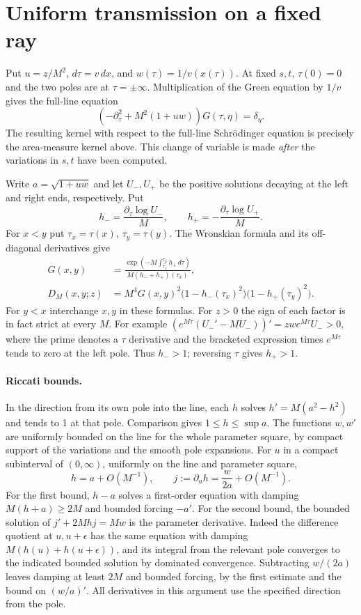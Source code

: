 \documentclass[11pt,letterpaper]{article}
\begin{document}
\section{Uniform transmission on a fixed ray}

Put \(u=z/M^2\), \(d\tau=v\,dx\), and \(w(\tau)=1/v(x(\tau))\).
At fixed \(s,t\), \(\tau(0)=0\) and the two poles are at
\(\tau=\pm\infty\). Multiplication of the Green equation by \(1/v\)
gives the full-line equation
\[
  (-\partial_\tau^2+M^2(1+uw))G(\tau,\eta)=\delta_\eta .
\]
The resulting kernel with respect to the full-line Schrödinger equation
is precisely the area-measure kernel above. This change of variable is
made \emph{after} the variations in \(s,t\) have been computed.

Write \(a=\sqrt{1+uw}\) and let \(U_-,U_+\) be the positive
solutions decaying at the left and right ends, respectively. Put
\[
 h_-=\frac{\partial_\tau\log U_-}{M},\qquad
 h_+=-\frac{\partial_\tau\log U_+}{M}.
\]
For \(x<y\) put \(\tau_x=\tau(x)\), \(\tau_y=\tau(y)\).
The Wronskian formula and its off-diagonal derivatives give
\begin{align*}
 G(x,y)&=
 \frac{\exp(-M\int_{\tau_x}^{\tau_y}h_+\,d\tau)}
 {M(h_-+h_+)(\tau_x)},\\
 D_M(x,y;z)&=M^4G(x,y)^2
       \big(1-h_-(\tau_x)^2\big)\big(1-h_+(\tau_y)^2\big).
\end{align*}
For \(y<x\) interchange \(x,y\) in these formulas.
For \(z>0\) the sign of each factor is in fact strict at every \(M\).
For example
\((e^{M\tau}(U_-'-MU_-))'=z w e^{M\tau}U_->0\),
where the prime denotes a \(\tau\) derivative and the bracketed
expression times \(e^{M\tau}\) tends to zero at the left pole.
Thus \(h_->1\); reversing \(\tau\) gives \(h_+>1\).

\paragraph{Riccati bounds.}
In the direction from its own pole into the line, each \(h\) solves
\(h'=M(a^2-h^2)\) and tends to 1 at that pole. Comparison gives
\(1\leq h\leq\sup a\). The functions \(w,w'\) are uniformly bounded
on the line for the whole parameter square, by compact support of the
variations and the smooth pole expansions. For \(u\) in a compact
subinterval of \((0,\infty)\), uniformly on the line and parameter square,
\[
 h=a+O(M^{-1}),\qquad
 j:=\partial_u h=\frac{w}{2a}+O(M^{-1}).
\]
For the first bound, \(h-a\) solves a first-order equation with
damping \(M(h+a)\geq 2M\) and bounded forcing \(-a'\).
For the second bound, the bounded solution of
\(j'+2Mhj=Mw\) is the parameter derivative. Indeed the difference
quotient at \(u,u+\epsilon\) has the same equation with damping
\(M(h(u)+h(u+\epsilon))\), and its integral from the relevant pole
converges to the indicated bounded solution by dominated convergence.
Subtracting \(w/(2a)\) leaves damping at least \(2M\) and bounded
forcing, by the first estimate and the bound on \((w/a)'\).
All derivatives in this argument use the specified direction from the pole.
\end{document}
